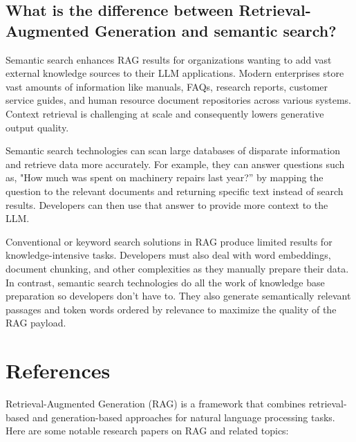 \subsection{What is the difference between Retrieval-Augmented Generation and semantic search?}

Semantic search enhances RAG results for organizations wanting to add vast external knowledge sources 
to their LLM applications. Modern enterprises store vast amounts of information like manuals, FAQs, 
research reports, customer service guides, and human resource document repositories across various 
systems. Context retrieval is challenging at scale and consequently lowers generative output quality.

Semantic search technologies can scan large databases of disparate information and retrieve data more 
accurately. For example, they can answer questions such as, "How much was spent on machinery repairs 
last year?” by mapping the question to the relevant documents and returning specific text instead of 
search results. Developers can then use that answer to provide more context to the LLM.

Conventional or keyword search solutions in RAG produce limited results for knowledge-intensive tasks. 
Developers must also deal with word embeddings, document chunking, and other complexities as they manually 
prepare their data. In contrast, semantic search technologies do all the work of knowledge base preparation 
so developers don't have to. They also generate semantically relevant passages and token words ordered 
by relevance to maximize the quality of the RAG payload.





\section{References}

Retrieval-Augmented Generation (RAG) is a framework that combines retrieval-based and generation-based approaches for natural language processing tasks. Here are some notable research papers on RAG and related topics:

